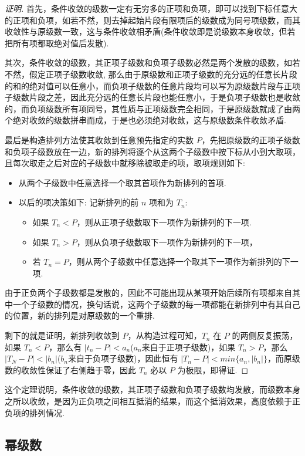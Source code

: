 \begin{proof}[证明]
 首先，条件收敛的级数一定有无穷多的正项和负项，即可以找到下标任意大的正项和负项，如若不然，则去掉起始片段有限项后的级数成为同号项级数，而其收敛性与原级数一致，这与条件收敛相矛盾(条件收敛即是说级数本身收敛，但若把所有项都取绝对值后发散).

 其次，条件收敛的级数，其正项子级数和负项子级数必然是两个发散的级数，如若不然，假定正项子级数收敛, 那么由于原级数和正项子级数的充分远的任意长片段的和的绝对值可以任意小，而负项子级数的任意片段均可以写为原级数片段与正项子级数片段之差，因此充分远的任意长片段也能任意小，于是负项子级数也是收敛的，而负项级数所有项同号，其性质与正项级数完全相同，于是原级数就成了由两个绝对收敛的级数拼串而成，于是也必须绝对收敛，这与原级数条件收敛矛盾.

 最后是构造排列方法使其收敛到任意预先指定的实数 $P$，先把原级数的正项子级数和负项子级数放在一边，新的排列将逐个从这两个子级数中按下标从小到大取项，且每次取走之后对应的子级数中就移除被取走的项，取项规则如下:
 \begin{itemize}
 \item 从两个子级数中任意选择一个取其首项作为新排列的首项.
 \item 以后的项决策如下: 记新排列的前 $n$ 项和为 $T_n$:
   \begin{itemize}
   \item 如果 $T_n<P$，则从正项子级数取下一项作为新排列的下一项.
   \item 如果 $T_n>P$，则从负项子级数取下一项作为新排列的下一项，
   \item 若 $T_n=P$，则从两个子级数中任意选择一个取其下一项作为新排列的下一项.
   \end{itemize}
 \end{itemize}
 由于正负两个子级数都是发散的，因此不可能出现从某项开始后续所有项都来自其中一个子级数的情况，换句话说，这两个子级数的每一项都能在新排列中有其自己的位置，新的排列是对原级数的一个重排.

 剩下的就是证明，新排列收敛到 $P$，从构造过程可知，$T_n$ 在 $P$ 的两侧反复振荡，如果 $T_n<P$，那么有 $|t_n-P|<a_n$($a_n$来自于正项子级数)，如果 $T_n>P$，那么 $|T_N-P|<|b_n|$($b_n$来自于负项子级数)，因此恒有 $|T_n-P|<min\{a_n,|b_n|\}$，而原级数的收敛性保证了右侧趋于零，因此 $T_n$ 必以 $P$ 为极限，即得证.
\end{proof}

这个定理说明，条件收敛的级数，其正项子级数和负项子级数均发散，而级数本身之所以收敛，是因为正负项之间相互抵消的结果，而这个抵消效果，高度依赖于正负项的排列情况.

\subsection{幂级数}
\label{sec:power-series}

